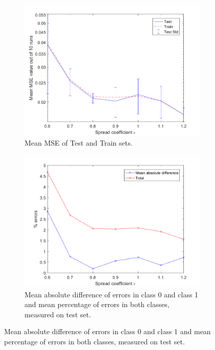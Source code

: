 \documentclass[a4paper, 11pt]{article}
\begin{document}
\begin{figure}[h]
    \centering
    \begin{subfigure}[t]{0.32\textwidth}
        \includegraphics[width=\textwidth]{../figures/perf/mseplot_m(20-20)_e(6-12).png}
        \caption{Mean MSE of Test and Train sets.}
        \label{fig:mse1}
    \end{subfigure}
    \hfill %
    \begin{subfigure}[t]{0.32\textwidth}
        \includegraphics[width=\textwidth]{../figures/perf/errorplot_m(20-20)_e(6-12).png}
        \caption{Mean absolute difference of errors in class 0 and class 1 and mean percentage of errors in both classes, measured on test set.}

\end{subfigure}
\end{figure}
\end{document}
